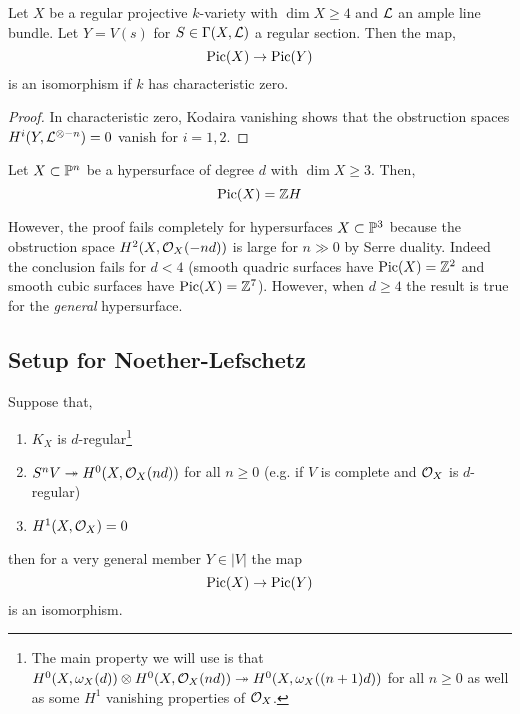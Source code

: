 \documentclass[12pt]{article}
\begin{document}
\begin{cor}
Let $X$ be a regular projective $k$-variety with $\dim{X} \ge 4$ and $\L$ an ample line bundle. Let $Y = V(s)$ for $S \in \Gamma(X, \L)$ a regular section. Then the map,
\[ \Pic{X} \to \Pic{Y} \]
is an isomorphism if $k$ has characteristic zero.
\end{cor}

\begin{proof}
In characteristic zero, Kodaira vanishing shows that the obstruction spaces $H^i(Y, \L^{\ot -n}) = 0$ vanish for $i = 1,2$. 
\end{proof}

\begin{cor}
Let $X \subset \P^n$ be a hypersurface of degree $d$ with $\dim{X} \ge 3$. Then,
\[ \Pic{X} = \Z H \]
\end{cor}

\begin{rmk}
However, the proof fails completely for hypersurfaces $X \subset \P^3$ because the obstruction space $H^2(X, \struct{X}(-nd))$ is large for $n \gg 0$ by Serre duality. Indeed the conclusion fails for $d < 4$ (smooth quadric surfaces have $\Pic{X} = \Z^2$ and smooth cubic surfaces have $\Pic{X} = \Z^7$). However, when $d \ge 4$ the result is true for the \textit{general} hypersurface. 
\end{rmk}

\subsection{Setup for Noether-Lefschetz}



\begin{theorem}
Suppose that,
\begin{enumerate}
\item $K_X$ is $d$-regular\footnote{The main property we will use is that $H^0(X, \omega_X(d)) \ot H^0(X, \struct{X}(nd)) \onto H^0(X, \omega_X((n+1)d))$ for all $n \ge 0$ as well as some $H^1$ vanishing properties of $\struct{X}$.}
\item $S^n V \onto H^0(X, \struct{X}(nd))$ for all $n \ge 0$ (e.g. if $V$ is complete and $\struct{X}$ is $d$-regular)
\item $H^1(X, \struct{X}) = 0$
\end{enumerate}
then for a very general member $Y \in |V|$ the map
\[ \Pic{X} \to \Pic{Y} \]
is an isomorphism. 
\end{theorem}
\end{document}
